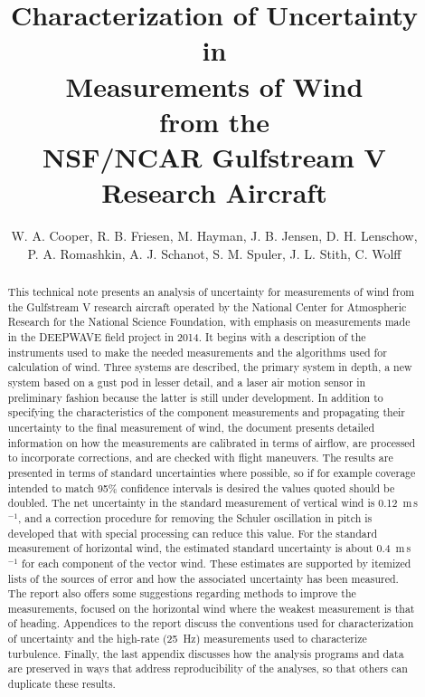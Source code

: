 \documentclass[12pt,twoside,english]{article}\usepackage[]{graphicx}\usepackage[]{color}
\begin{document}
\title{Characterization of Uncertainty \\
 in \\Measurements of Wind\\
 from the \\NSF/NCAR Gulfstream V Research Aircraft}


\author{W. A. Cooper, R. B. Friesen, M. Hayman, J. B. Jensen, D. H. Lenschow, \\P. A. Romashkin, A. J. Schanot, S. M. Spuler, J. L. Stith, C. Wolff}


\thispagestyle{empty}
\maketitle
\vfill{}
\eject%
\cleardoublepage
{}



\begin{abstract}

This technical note presents an analysis of uncertainty for measurements
of wind from the Gulfstream V research aircraft operated by the National
Center for Atmospheric Research for the National Science Foundation,
with emphasis on measurements made in the DEEPWAVE field project in
2014. It begins with a description of the instruments used to make
the needed measurements and the algorithms used for calculation of
wind. Three systems are described, the primary system in depth, a
new system based on a gust pod in lesser detail, and a laser air motion
sensor in preliminary fashion because the latter is still under development.
In addition to specifying the characteristics of the component measurements
and propagating their uncertainty to the final measurement of wind,
the document presents detailed information on how the measurements
are calibrated in terms of airflow, are processed to incorporate corrections,
and are checked with flight maneuvers. The results are presented in
terms of standard uncertainties where possible, so if for example
coverage intended to match 95\% confidence intervals is desired the
values quoted should be doubled. The net uncertainty in the standard
measurement of vertical wind is 0.12~m\,s$^{-1}$, and a correction
procedure for removing the Schuler oscillation in pitch is developed
that with special processing can reduce this value. For the standard
measurement of horizontal wind, the estimated standard uncertainty
is about 0.4~m\,s$^{-1}$ for each component of the vector wind.
These estimates are supported by itemized lists of the sources of
error and how the associated uncertainty has been measured. The report
also offers some suggestions regarding methods to improve the measurements,
focused on the horizontal wind where the weakest measurement is that
of heading. Appendices to the report discuss the conventions used
for characterization of uncertainty and the high-rate (25~Hz) measurements
used to characterize turbulence. Finally, the last appendix discusses
how the analysis programs and data are preserved in ways that address
reproducibility of the analyses, so that others can duplicate these
results.
\end{abstract}
\clearpage
\end{document}
